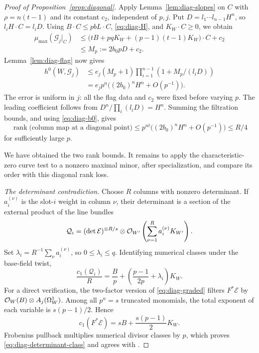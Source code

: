 \begin{proof}[Proof of Proposition~\ref{prop:diagonal}]
Apply Lemma~\ref{lem:diag-slopes} on $C$ with
$\rho=n(t-1)$ and its constant $c_2$, independent of $p,j$.
Put $D=l_1\cdots l_{n-1}H^n$, so $l_iH\cdot C=l_iD$.
Using $B\cdot C\le pbL\cdot C$, \eqref{eq:diag-H}, and
$K_W\cdot C\ge0$, we obtain
\begin{align*}
 \mu_{\max}(\mathcal G_j|_C)
 &\le \bigl(tB+pqK_W+(p-1)(t-1)K_W\bigr)\cdot C+c_2\\
 &\le M_p:=2b_0pD+c_2.
\end{align*}
Lemma~\ref{lem:diag-flag} now gives
\begin{equation}\label{eq:diag-piece-bound}
 \begin{split}
 h^0(W,\mathcal G_j)
 &\le e_j(M_p+1)\prod_{i=1}^{n-1}(1+M_p/(l_iD))\\
 &=e_jp^n\bigl((2b_0)^nH^n+O(p^{-1})\bigr).
 \end{split}
\end{equation}
The error is uniform in $j$: all the flag data and $c_2$ were
fixed before varying $p$. The leading coefficient follows from
$D^n/\prod_i(l_iD)=H^n$.
Summing the filtration bounds, and using \eqref{eq:diag-b0}, gives
\begin{equation}\label{eq:diag-rank-loss}
 \operatorname{rank}\bigl(\text{column map at a diagonal point}\bigr)
 \le p^{nt}\bigl((2b_0)^nH^n+O(p^{-1})\bigr)
 \le R/4
\end{equation}
for sufficiently large $p$.

We have obtained the two rank bounds. It remains to apply the
characteristic-zero curve test to a nonzero maximal minor, after
specialization, and compare its order with this diagonal rank loss.

\medskip\noindent\emph{The determinant contradiction.}
Choose $R$ columns with nonzero determinant. If $a_i^{(\nu)}$ is
the slot-$i$ weight in column $\nu$, their determinant is a section
of the external product of the line bundles
\[
 \mathcal Q_i=(\det\mathcal E)^{\otimes R/s}
       \otimes\mathcal O_{W'}\left(\sum_{\nu=1}^R a_i^{(\nu)}K_{W'}\right).
\]
Set $\lambda_i=R^{-1}\sum_\nu a_i^{(\nu)}$, so $0\le\lambda_i\le q$.
Identifying numerical classes under the base-field twist,
\begin{equation}\label{eq:diag-determinant-class}
 \frac{c_1(\mathcal Q_i)}R
 =\frac Bp+\left(\frac{p-1}{2p}+\lambda_i\right)K_W.
\end{equation}
For a direct verification, the two-factor version of
\eqref{eq:diag-graded} filters $F^*\mathcal E$ by
$\mathcal O_W(B)\otimes A_j(\Omega_W^1)$. Among all $p^n=s$
truncated monomials, the total exponent of each variable is
$s(p-1)/2$. Hence
\[
 c_1(F^*\mathcal E)=sB+\frac{s(p-1)}2K_W.
\]
Frobenius pullback multiplies numerical divisor classes by $p$,
which proves \eqref{eq:diag-determinant-class} and agrees with
\cite[Lemma~4.2]{Sun2008}.


\end{proof}
